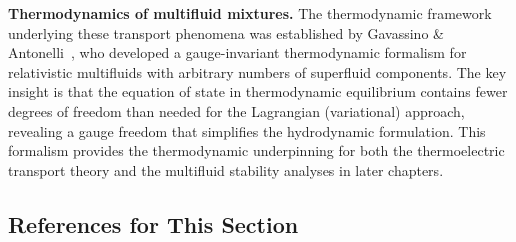 \begin{relcorrection}
\textbf{Thermodynamics of multifluid mixtures.}
The thermodynamic framework underlying these transport phenomena was
established by Gavassino \&
Antonelli~\cite{GavassinoAntonelliMultifluidThermo2019}, who
developed a gauge-invariant thermodynamic formalism for relativistic
multifluids with arbitrary numbers of superfluid components.  The
key insight is that the equation of state in thermodynamic
equilibrium contains fewer degrees of freedom than needed for the
Lagrangian (variational) approach, revealing a gauge freedom that
simplifies the hydrodynamic formulation.  This formalism provides
the thermodynamic underpinning for both the thermoelectric transport
theory and the multifluid stability analyses in later chapters.
\end{relcorrection}

\subsection*{References for This Section}

